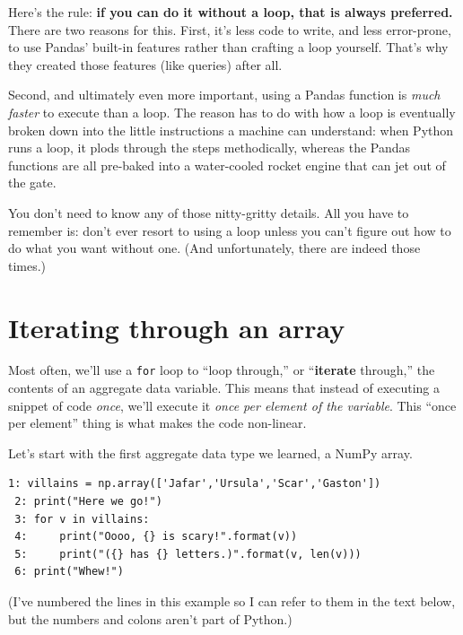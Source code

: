 Here's the rule: \textbf{if you can do it without a loop, that is always
preferred.} There are two reasons for this. First, it's less code to write, and
less error-prone, to use Pandas' built-in features rather than crafting a loop
yourself. That's why they created those features (like queries) after all.

Second, and ultimately even more important, using a Pandas function is
\textit{much faster} to execute than a loop. The reason has to do with how a
loop is eventually broken down into the little instructions a machine can
understand: when Python runs a loop, it plods through the steps methodically,
whereas the Pandas functions are all pre-baked into a water-cooled rocket
engine that can jet out of the gate.

You don't need to know any of those nitty-gritty details. All you have to
remember is: don't ever resort to using a loop unless you can't figure out how
to do what you want without one. (And unfortunately, there are indeed those
times.)

\section{Iterating through an array}

\label{arrayLoops}

Most often, we'll use a \texttt{for} loop to ``loop through,'' or
``\textbf{iterate} through,'' the contents of an aggregate data variable. This
means that instead of executing a snippet of code \textit{once}, we'll execute
it \textit{once per element of the variable}. This ``once per element'' thing
is what makes the code non-linear.


Let's start with the first aggregate data type we learned, a NumPy array.

\begin{Verbatim}[fontsize=\footnotesize,samepage=true,frame=single,framesep=3mm]
 1: villains = np.array(['Jafar','Ursula','Scar','Gaston'])
 2: print("Here we go!")
 3: for v in villains:
 4:     print("Oooo, {} is scary!".format(v))
 5:     print("({} has {} letters.)".format(v, len(v)))
 6: print("Whew!")
\end{Verbatim}

\label{loopBody}

(I've numbered the lines in this example so I can refer to them in the text
below, but the numbers and colons aren't part of Python.)

